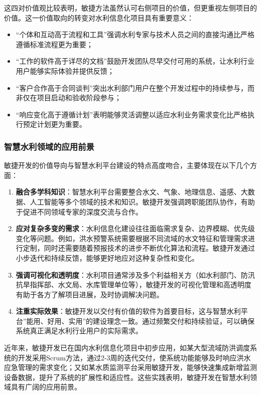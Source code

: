 这四对价值观比较表明，敏捷方法虽然认可右侧项目的价值，但更重视左侧项目的价值。这一价值取向的转变对水利信息化项目具有重要意义：

\begin{itemize}
\tightlist
\item
  ``个体和互动高于流程和工具''强调水利专家与技术人员之间的直接沟通比严格遵循标准流程更为重要；
\item
  ``工作的软件高于详尽的文档''鼓励开发团队尽早交付可用的系统，让水利行业用户能够实际体验并提供反馈；
\item
  ``客户合作高于合同谈判''突出水利部门用户在整个开发过程中的持续参与，而非仅在项目启动和验收阶段参与；
\item
  ``响应变化高于遵循计划''表明能够灵活调整以适应水利业务需求变化比严格执行预定计划更为重要。
\end{itemize}

\subsubsection{智慧水利领域的应用前景}\label{ux667aux6167ux6c34ux5229ux9886ux57dfux7684ux5e94ux7528ux524dux666f}

敏捷开发的价值导向与智慧水利平台建设的特点高度吻合，主要体现在以下几个方面：

\begin{enumerate}
\def\labelenumi{\arabic{enumi}.}
\item
  \textbf{融合多学科知识}：智慧水利平台需要整合水文、气象、地理信息、遥感、大数据、人工智能等多个领域的技术和知识。敏捷开发强调跨职能团队协作，有助于促进不同领域专家的深度交流与合作。
\item
  \textbf{应对复杂多变的需求}：水利信息化建设往往面临需求复杂、边界模糊、优先级变化等问题。例如，洪水预警系统需要根据不同流域的水文特征和管理需求进行定制，同时还需要随着预报技术的进步不断优化算法和流程。敏捷开发通过小步迭代和持续反馈，能够更好地应对这种复杂性和变化。
\item
  \textbf{强调可视化和透明度}：水利项目通常涉及多个利益相关方（如水利部门、防汛抗旱指挥部、水文局、水库管理单位等），敏捷开发的可视化管理和高透明度有助于各方了解项目进展，及时协调解决问题。
\item
  \textbf{注重实际效果}：敏捷开发以交付有价值的软件为首要目标，这与智慧水利平台''能用、好用、实用''的建设理念一致。通过频繁交付和持续验证，可以确保系统真正满足水利行业用户的实际需求。
\end{enumerate}

近年来，敏捷开发已在国内水利信息化项目中初步应用，如某大型流域防洪调度系统的开发采用Scrum方法，通过2-3周的迭代交付，使系统功能能够及时响应洪水应急管理的需求变化；又如某水质监测平台采用敏捷开发，能够快速集成新增监测设备数据，提升了系统的扩展性和适应性。这些实践表明，敏捷开发在智慧水利领域具有广阔的应用前景。

